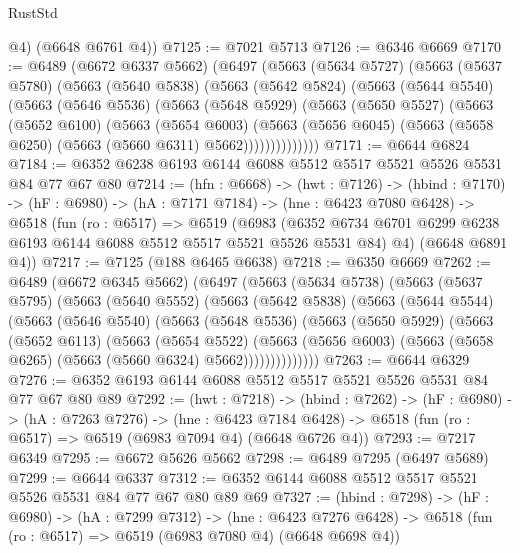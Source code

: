 \begin{lexlean}{RustStd}
\begin{coremodule}
{\begin{coremodule}
{{{{{{{{{{        @4)
      (@6648 @6761 @4))
@7125 := @7021 @5713
@7126 := @6346 @6669
@7170 := @6489
    (@6672 @6337 @5662)
    (@6497
      (@5663
        (@5634 @5727)
        (@5663
          (@5637 @5780)
          (@5663
            (@5640 @5838)
            (@5663
              (@5642 @5824)
              (@5663
                (@5644 @5540)
                (@5663
                  (@5646 @5536)
                  (@5663
                    (@5648 @5929)
                    (@5663
                      (@5650 @5527)
                      (@5663
                        (@5652 @6100)
                        (@5663
                          (@5654 @6003)
                          (@5663
                            (@5656 @6045)
                            (@5663 (@5658 @6250) (@5663 (@5660 @6311) @5662))))))))))))))
@7171 := @6644 @6824
@7184 := @6352 @6238 @6193 @6144 @6088 @5512 @5517 @5521 @5526 @5531 @84 @77 @67 @80
@7214 := (hfn : @6668) ->
  (hwt : @7126) ->
  (hbind : @7170) ->
  (hF : @6980) ->
  (hA : @7171 @7184) ->
  (hne : @6423 @7080 @6428) ->
  @6518
    (fun (ro : @6517) =>
    @6519
      (@6983 (@6352 @6734 @6701 @6299 @6238 @6193 @6144 @6088 @5512 @5517 @5521 @5526 @5531 @84) @4)
      (@6648 @6891 @4))
@7217 := @7125 (@188 @6465 @6638)
@7218 := @6350 @6669
@7262 := @6489
    (@6672 @6345 @5662)
    (@6497
      (@5663
        (@5634 @5738)
        (@5663
          (@5637 @5795)
          (@5663
            (@5640 @5552)
            (@5663
              (@5642 @5838)
              (@5663
                (@5644 @5544)
                (@5663
                  (@5646 @5540)
                  (@5663
                    (@5648 @5536)
                    (@5663
                      (@5650 @5929)
                      (@5663
                        (@5652 @6113)
                        (@5663
                          (@5654 @5522)
                          (@5663
                            (@5656 @6003)
                            (@5663 (@5658 @6265) (@5663 (@5660 @6324) @5662))))))))))))))
@7263 := @6644 @6329
@7276 := @6352 @6193 @6144 @6088 @5512 @5517 @5521 @5526 @5531 @84 @77 @67 @80 @89
@7292 := (hwt : @7218) ->
  (hbind : @7262) ->
  (hF : @6980) ->
  (hA : @7263 @7276) ->
  (hne : @6423 @7184 @6428) -> @6518 (fun (ro : @6517) => @6519 (@6983 @7094 @4) (@6648 @6726 @4))
@7293 := @7217 @6349
@7295 := @6672 @5626 @5662
@7298 := @6489 @7295 (@6497 @5689)
@7299 := @6644 @6337
@7312 := @6352 @6144 @6088 @5512 @5517 @5521 @5526 @5531 @84 @77 @67 @80 @89 @69
@7327 := (hbind : @7298) ->
  (hF : @6980) ->
  (hA : @7299 @7312) ->
  (hne : @6423 @7276 @6428) -> @6518 (fun (ro : @6517) => @6519 (@6983 @7080 @4) (@6648 @6698 @4))
}}}}}}}}}}
\end{coremodule}}
\end{coremodule}
\end{lexlean}
